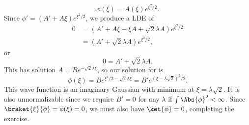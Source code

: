 {%
\begin{equation}\label{eqn:qmIexamPractice2008Dec:1e:50}
\phi(\xi) = A(\xi) e^{\xi^2/2}.
\end{equation}
%
Since \(\phi' = (A' + A \xi) e^{\xi^2/2}\), we produce a LDE of
%
\begin{equation}\label{eqn:qmIexamPractice:670}
\begin{aligned}
0 &= (A' + A \xi -\xi A + \sqrt{2} \lambda A ) e^{\xi^2/2} \\
&= (A' + \sqrt{2} \lambda A ) e^{\xi^2/2},
\end{aligned}
\end{equation}
%
or
\begin{equation}\label{eqn:qmIexamPractice2008Dec:1e:60}
0 = A' + \sqrt{2} \lambda A.
\end{equation}
%
This has solution \(A = B e^{-\sqrt{2} \lambda \xi}\), so our solution for  is
\begin{equation}\label{eqn:qmIexamPractice2008Dec:1e:70}
\phi(\xi) = B e^{\xi^2/2 - \sqrt{2} \lambda \xi}
= B' e^{ (\xi - \lambda \sqrt{2} )^2/2}.
\end{equation}
%
This wave function is an imaginary Gaussian with minimum at \(\xi = \lambda\sqrt{2}\).  It is also unnormalizable since we require \(B' = 0\) for any \(\lambda\) if \(\int \Abs{\phi}^2 < \infty\).  Since \(\braket{\xi}{\phi} = \phi(\xi) = 0\), we must also have \(\ket{\phi} = 0\), completing the exercise.

} %
